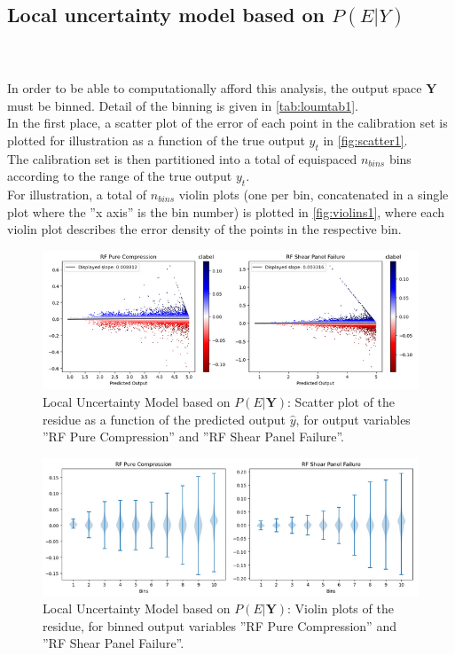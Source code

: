 \FloatBarrier
\subsection{Local uncertainty model based on $P(E|Y)$}
\paragraph{ \\}
In order to be able to computationally afford this analysis, the output space $\mathbf{Y}$ must be binned. Detail of the binning is given in \autoref{tab:loumtab1}.\\
\indent In the first place, a scatter plot of the error of each point in the calibration set is plotted for illustration as a function of the true output $y_t$ in \autoref{fig:scatter1}.\\
\indent The calibration set is then partitioned into a total of equispaced $n_{bins}$ bins according to the range of the true output $y_t$.\\
\indent For illustration, a total of $n_{bins}$ violin plots (one per bin, concatenated in a single plot where the ''x axis'' is the bin number) is plotted in \autoref{fig:violins1}, where each violin plot describes the error density of the points in the respective bin.\\
%
\begin{figure}[!htb]
	\centering
	\includegraphics[width=\textwidth]{Figures/uncertainty/scatter1.png}
	\caption{Local Uncertainty Model based on $P(E|\mathbf{Y})$: Scatter plot of the residue as a function of the predicted output $\hat{y}$, for output variables ''RF Pure Compression'' and ''RF Shear Panel Failure''.}
	\label{fig:scatter1}
\end{figure}
\begin{figure}[!htb]
	\centering
	\includegraphics[width=\textwidth]{Figures/uncertainty/violines1.png}
	\caption{Local Uncertainty Model based on $P(E|\mathbf{Y})$: Violin plots of the residue, for binned output variables ''RF Pure Compression'' and ''RF Shear Panel Failure''.}
	\label{fig:violins1}
\end{figure}

